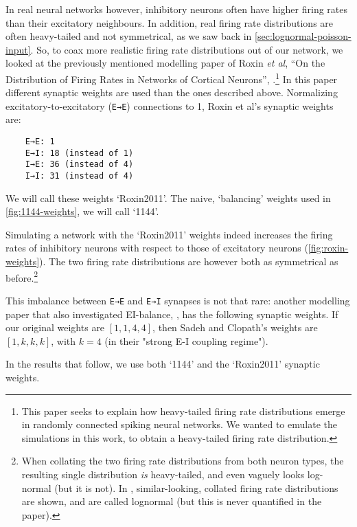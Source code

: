 In real neural networks however, inhibitory neurons often have higher firing rates than their excitatory neighbours. In addition, real firing rate distributions are often heavy-tailed and not symmetrical, as we saw back in \cref{sec:lognormal-poisson-input}.
So, to coax more realistic firing rate distributions out of our network, we looked at the previously mentioned modelling paper of Roxin \emph{et al}, ``On the Distribution of Firing Rates in Networks of Cortical Neurons'', \cite{Roxin2011DistributionFiringRates}.\footnote{
    This paper seeks to explain how heavy-tailed firing rate distributions emerge in randomly connected spiking neural networks. We wanted to emulate the simulations in this work, to obtain a heavy-tailed firing rate distribution.
}
In this paper different synaptic weights are used than the ones described above.
Normalizing excitatory-to-excitatory (\verb|E→E|) connections to 1, Roxin et al's synaptic weights are:
\begin{verbatim}
    E→E: 1
    E→I: 18 (instead of 1)
    I→E: 36 (instead of 4)
    I→I: 31 (instead of 4)
\end{verbatim}
We will call these weights `Roxin2011'. The naive, `balancing' weights used in \cref{fig:1144-weights}, we will call `1144'.

Simulating a network with the `Roxin2011' weights indeed increases the firing rates of inhibitory neurons with respect to those of excitatory neurons (\cref{fig:roxin-weights}). The two firing rate distributions are however both as symmetrical as before.\footnote{
    When collating the two firing rate distributions from both neuron types, the resulting single distribution \emph{is} heavy-tailed, and even vaguely looks log-normal (but it is not). In \cite{Roxin2011DistributionFiringRates}, similar-looking, collated firing rate distributions are shown, and are called lognormal (but this is never quantified in the paper).
}

This imbalance between \verb|E→E| and \verb|E→I| synapses is not that rare: another modelling paper that also investigated EI-balance, \cite{Sadeh2021ExcitatoryinhibitoryBalanceModulates}, has the following synaptic weights. If our original weights are $[1, 1, 4, 4]$, then Sadeh and Clopath's weights are $[1, k, k, k]$, with $k = 4$ (in their "strong E-I coupling regime").

In the results that follow, we use both `1144' and the `Roxin2011' synaptic weights.

